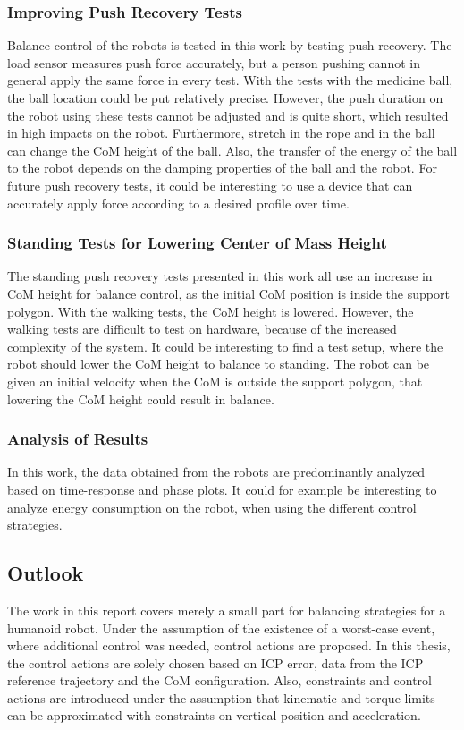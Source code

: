 \subsubsection{Improving Push Recovery Tests}
Balance control of the robots is tested in this work by testing push recovery. The load sensor measures push force accurately, but a person pushing cannot in general apply the same force in every test. With the tests with the medicine ball, the ball location could be put relatively precise. However, the push duration on the robot using these tests cannot be adjusted and is quite short, which resulted in high impacts on the robot. Furthermore, stretch in the rope and in the ball can change the \ac{CoM} height of the ball. Also, the transfer of the energy of the ball to the robot depends on the damping properties of the ball and the robot. For future push recovery tests, it could be interesting to use a device that can accurately apply force according to a desired profile over time.
\subsubsection{Standing Tests for Lowering Center of Mass Height}
The standing push recovery tests presented in this work all use an increase in \ac{CoM} height for balance control, as the initial \ac{CoM} position is inside the support polygon. With the walking tests, the \ac{CoM} height is lowered. However, the walking tests are difficult to test on hardware, because of the increased complexity of the system. It could be interesting to find a test setup, where the robot should lower the \ac{CoM} height to balance to standing. The robot can be given an initial velocity when the \ac{CoM} is outside the support polygon, that lowering the \ac{CoM} height could result in balance.
\subsubsection{Analysis of Results}
In this work, the data obtained from the robots are predominantly analyzed based on time-response and phase plots. It could for example be interesting to analyze energy consumption on the robot, when using the different control strategies. 

\subsection{Outlook}
The work in this report covers merely a small part for balancing strategies for a humanoid robot. Under the assumption of the existence of a worst-case event, where additional control was needed, control actions are proposed. In this thesis, the control actions are solely chosen based on \ac{ICP} error, data from the \ac{ICP} reference trajectory and the \ac{CoM} configuration. Also, constraints and control actions are introduced under the assumption that kinematic and torque limits can be approximated with constraints on vertical position and acceleration. 

